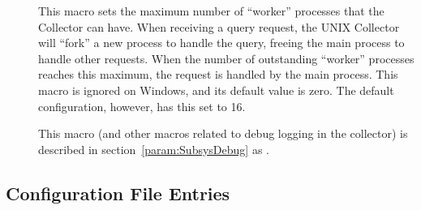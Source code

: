 \begin{description}
 \item[]
  \label{param:CollectorQueryWorkers} This macro sets the maximum
  number of ``worker'' processes that the Collector can have.  When
  receiving a query request, the UNIX Collector will ``fork'' a new
  process to handle the query, freeing the main process to handle
  other requests.  When the number of outstanding ``worker'' processes
  reaches this maximum, the request is handled by the main process.
  This macro is ignored on Windows, and its default value is zero.
  The default configuration, however, has this set to 16.

\item[] \label{param:CollectorDebug} This
  macro (and other macros related to debug logging in the collector)
  is described in section~\ref{param:SubsysDebug} as
  .

\end{description}

\subsection{\label{sec:Negotiator-Config-File-Entries}
Configuration File Entries}

